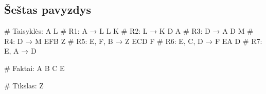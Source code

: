 \subsection{Šeštas pavyzdys}

\begin{pythonaienv}[fc]

# Taisyklės:
A L                                     # R1: A → L
L K                                     # R2: L → K
D A                                     # R3: D → A
D M                                     # R4: D → M
EFB Z                                   # R5: E, F, B → Z
ECD F                                   # R6: E, C, D → F
EA D                                    # R7: E, A → D

# Faktai:
A B C E

# Tikslas:
Z

\end{pythonaienv}

